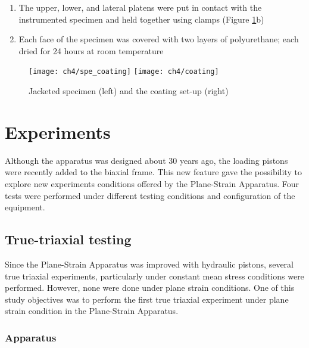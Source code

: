 \begin{enumerate}
    \item The upper, lower, and lateral platens were put in contact with the instrumented specimen and held together using clamps (Figure \ref{fig4:7}b)
    \item Each face of the specimen was covered with two layers of polyurethane; each dried for 24 hours at room temperature
\end{enumerate}

\begin{figure}[tb]
    \centering
    \texttt{[image: ch4/spe\_coating]}
    \texttt{[image: ch4/coating]}
    \captionsetup{justification=centering}
    \caption{Jacketed specimen (left) and the coating set-up (right)}
    \label{fig4:7}
\end{figure} 

\section{Experiments} \label{ch4:exp}

Although the apparatus was designed about 30 years ago, the loading pistons were recently added to the biaxial frame. This new feature gave the possibility to explore new experiments conditions offered by the Plane-Strain Apparatus. Four tests were performed under different testing conditions and configuration of the equipment. 

\subsection{True-triaxial testing }

Since the Plane-Strain Apparatus was improved with hydraulic pistons, several true triaxial experiments, particularly under constant mean stress conditions were performed. However, none were done under plane strain conditions. One of this study objectives was to perform the first true triaxial experiment under plane strain condition in the Plane-Strain Apparatus. 

\subsubsection{Apparatus}

